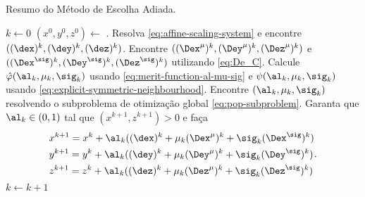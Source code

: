 \begin{algorithm}
\onehalfspacing
\caption{Resumo do Método de Escolha Adiada.}
\label{alg:optimized-choice-of-parameters} \begin{algorithmic}[1]
\State $k \gets 0$
\State $(x^0,y^0,z^0) \gets$ .
	\Repeat
		\State Resolva   \eqref{eq:affine-scaling-system} e encontre
		$((\dex)^{k},(\dey)^{k},(\dez)^{k})$.
		\State 	Encontre $((\Dex^\mu)^{k},(\Dey^\mu)^{k},(\Dez^\mu)^{k})$ e
		$((\Dex^\sig)^{k},(\Dey^\sig)^{k},(\Dez^\sig)^{k})$ utilizando
		\eqref{eq:De_C}.
		\State Calcule  $\hat{\varphi}(\al_{k},\mu_{k},\sig_{k})$ usando
		\eqref{eq:merit-function-al-mu-sig} e $\psi(\al_{k},\mu_{k},\sig_{k})$ usando
		\eqref{eq:explicit-symmetric-neighbourhood}.
		\State Encontre $(\al_{k},\mu_{k},\sig_{k})$ resolvendo o subproblema de
		otimização global 
		\eqref{eq:pop-subproblem}.
		\State Garanta que $\al_k\in(0,1)$ tal que $(x^{k+1},z^{k+1})>0$ e faça
		\[
		\begin{aligned}	
		& x^{k+1} = x^{k} + \al_k((\dex)^{k} + \mu_{k}(\Dex^\mu)^{k} +
		\sig_{k}(\Dex^\sig)^{k} )
		\\
		& y^{k+1} = y^{k} + \al_k((\dey)^{k} + \mu_{k}(\Dey^\mu)^{k} +
		\sig_{k}(\Dey^\sig)^{k} )
		\\
		& z^{k+1} = z^{k} + \al_k((\dez)^{k} + \mu_{k}(\Dez^\mu)^{k} +
		\sig_{k}(\Dez^\sig)^{k} ) \end{aligned}. 
		\]		
		\State $k\gets k+1$
\EndProcedure
\end{algorithmic}
\end{algorithm}
  
 
 
